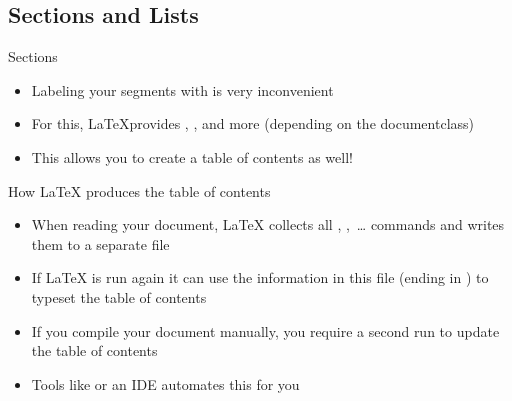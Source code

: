 \subsection{Sections and Lists}


\begin{frame}{Sections}
   \begin{itemize}
      \item Labeling your segments with \soldisablenumhl{} is very inconvenient
      \item For this, \LaTeX provides \blatex{\\section}, \blatex{\\subsection}, and more (depending on the documentclass)
      \item This allows you to create a table of contents as well!
   \end{itemize}
\end{frame}

\begin{frame}{How \LaTeX{} produces the table of contents}
   \begin{itemize}
      \itemsep8pt
      \item When reading your document, \LaTeX{} collects all \blatex{\\section}, \blatex{\\subsection},~\ldots{} commands and writes them to a separate file
      \item If \LaTeX{} is run again it can use the information in this file (ending in ) to typeset the table of contents
      \item If you compile your document manually, you require a second run to update the table of contents
      \item Tools like  or an IDE automates this for you
   \end{itemize}
\end{frame}

